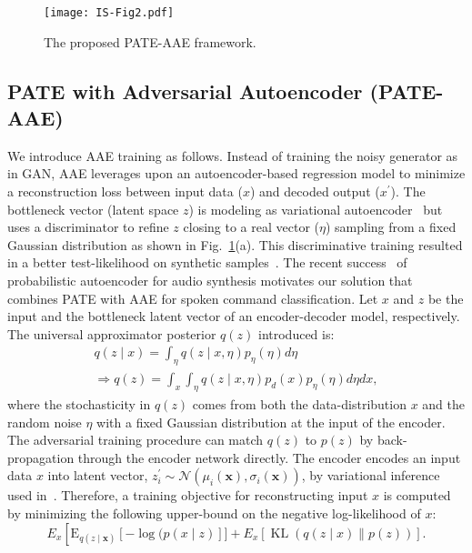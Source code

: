 \documentclass[a4paper]{article}
\begin{document}
\begin{figure}[ht!]
    \centering
    \texttt{[image: IS-Fig2.pdf]}
    \caption{The proposed PATE-AAE framework. }
    \label{fig:2}
\end{figure}

\subsection{PATE with Adversarial Autoencoder (PATE-AAE)}
We introduce AAE training as follows. Instead of training the noisy generator as in GAN, AAE leverages upon an autoencoder-based regression model to minimize a reconstruction loss between input data ($x$) and decoded output ($x^{\prime}$). The bottleneck vector (latent space $z$) is modeling as variational autoencoder~\cite{kingma2013auto} but uses a discriminator to refine $z$ closing to a real vector ($\eta$) sampling from a fixed Gaussian distribution as shown in Fig.~\ref{fig:2}(a). This discriminative training resulted in a better test-likelihood on synthetic samples~\cite{makhzani2015adversarial}. The recent success~\cite{chorowski2019unsupervised} of probabilistic autoencoder for audio synthesis motivates our solution that combines PATE with AAE for spoken command classification. Let $x$ and $z$ be the input and the bottleneck latent vector of an encoder-decoder model, respectively. The universal approximator posterior $q(z)$ introduced \cite{makhzani2015adversarial} is:
\begin{align}
q(z \mid x)=\int_{\eta} q(z \mid x, \eta) p_{\eta}(\eta) d \eta \\
\Rightarrow q(z)=\int_{x} \int_{\eta} q(z \mid x, \eta) p_{d}(x) p_{\eta}(\eta) d \eta d x,
\end{align}
where the stochasticity in $q(z)$ comes from both the data-distribution $x$ and the random noise $\eta$ with a fixed Gaussian distribution at the input of the encoder. The adversarial training procedure can match $q(z)$ to $p(z)$ by back-propagation through the encoder network directly. The encoder encodes an input data $x$ into latent vector, $z^{\prime}_i \sim \mathcal{N}\left(\mu_{i}(\mathbf{x}), \sigma_{i}(\mathbf{x})\right)$, by variational inference used in~\cite{kingma2013auto}. Therefore, a training objective for reconstructing input $x$ is computed by minimizing the following upper-bound on the negative log-likelihood of $x$:
\begin{equation}
E_{x}\left[\mathrm{E}_{q(z \mid \mathbf{x})}[-\log (p(x \mid z)]]+E_{x}[\operatorname{KL}(q(z \mid x) \| p(z))].\right.
\label{eq:6}
\end{equation}
\end{document}
